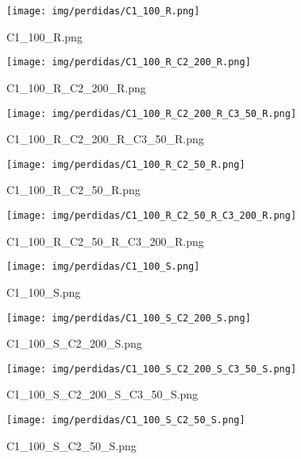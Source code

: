\begin{figure}[H]
    \centerline{\texttt{[image: img/perdidas/C1\_100\_R.png]}}
    \caption{C1_100_R.png}
    \label{fig:C1_100_R.png}
\end{figure}

\begin{figure}[H]
    \centerline{\texttt{[image: img/perdidas/C1\_100\_R\_C2\_200\_R.png]}}
    \caption{C1_100_R_C2_200_R.png}
    \label{fig:C1_100_R_C2_200_R.png}
\end{figure}

\begin{figure}[H]
    \centerline{\texttt{[image: img/perdidas/C1\_100\_R\_C2\_200\_R\_C3\_50\_R.png]}}
    \caption{C1_100_R_C2_200_R_C3_50_R.png}
    \label{fig:C1_100_R_C2_200_R_C3_50_R.png}
\end{figure}

\begin{figure}[H]
    \centerline{\texttt{[image: img/perdidas/C1\_100\_R\_C2\_50\_R.png]}}
    \caption{C1_100_R_C2_50_R.png}
    \label{fig:C1_100_R_C2_50_R.png}
\end{figure}

\begin{figure}[H]
    \centerline{\texttt{[image: img/perdidas/C1\_100\_R\_C2\_50\_R\_C3\_200\_R.png]}}
    \caption{C1_100_R_C2_50_R_C3_200_R.png}
    \label{fig:C1_100_R_C2_50_R_C3_200_R.png}
\end{figure}

\begin{figure}[H]
    \centerline{\texttt{[image: img/perdidas/C1\_100\_S.png]}}
    \caption{C1_100_S.png}
    \label{fig:C1_100_S.png}
\end{figure}

\begin{figure}[H]
    \centerline{\texttt{[image: img/perdidas/C1\_100\_S\_C2\_200\_S.png]}}
    \caption{C1_100_S_C2_200_S.png}
    \label{fig:C1_100_S_C2_200_S.png}
\end{figure}

\begin{figure}[H]
    \centerline{\texttt{[image: img/perdidas/C1\_100\_S\_C2\_200\_S\_C3\_50\_S.png]}}
    \caption{C1_100_S_C2_200_S_C3_50_S.png}
    \label{fig:C1_100_S_C2_200_S_C3_50_S.png}
\end{figure}

\begin{figure}[H]
    \centerline{\texttt{[image: img/perdidas/C1\_100\_S\_C2\_50\_S.png]}}
    \caption{C1_100_S_C2_50_S.png}
    \label{fig:C1_100_S_C2_50_S.png}
\end{figure}

